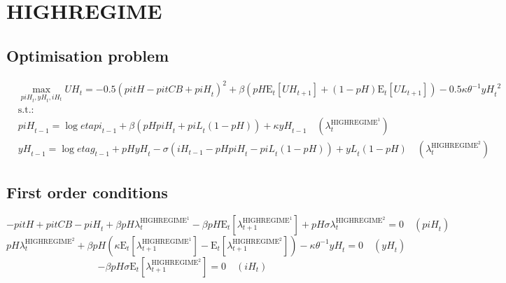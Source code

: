 

\section{HIGHREGIME}

\subsection{Optimisation problem}

\begin{align}
&\max_{{p\!i\!H}_{t}, {y\!H}_{t}, {i\!H}_{t}
} {U\!H}_{t} = -0.5\left({p\!i\!t\!H} - {p\!i\!t\!C\!B} + {p\!i\!H}_{t}\right)^{2} + {\beta} \left({{p\!H}} {\mathrm{E}_{t}\left[{U\!H}_{t+1}\right]} + \left(1 - {p\!H}\right) {\mathrm{E}_{t}\left[{U\!L}_{t+1}\right]}\right) - 0.5{\kappa} {\theta}^{-1} {{y\!H}_{t}}^{2}\\
&\mathrm{s.t.:}\nonumber\\
& {p\!i\!H}_{t-1} = \log{{e\!t\!a\!p\!i}_{t-1}} + {\beta} \left({{p\!H}} {{p\!i\!H}_{t}} + {{p\!i\!L}_{t}} \left(1 - {p\!H}\right)\right) + {\kappa} {{y\!H}_{t-1}} \quad \left(\lambda^{\mathrm{HIGHREGIME}^{\mathrm{1}}}_{t}\right)\\
& {y\!H}_{t-1} = \log{{e\!t\!a\!g}_{t-1}} + {{p\!H}} {{y\!H}_{t}} - {\sigma} \left({i\!H}_{t-1} - {{p\!H}} {{p\!i\!H}_{t}} - {{p\!i\!L}_{t}} \left(1 - {p\!H}\right)\right) + {{y\!L}_{t}} \left(1 - {p\!H}\right) \quad \left(\lambda^{\mathrm{HIGHREGIME}^{\mathrm{2}}}_{t}\right)
\end{align}


\subsection{First order conditions}

\begin{equation}
-{p\!i\!t\!H} + {p\!i\!t\!C\!B} - {p\!i\!H}_{t} + {\beta} {{p\!H}} {\lambda^{\mathrm{HIGHREGIME}^{\mathrm{1}}}_{t}} - {\beta} {{p\!H}} {\mathrm{E}_{t}\left[\lambda^{\mathrm{HIGHREGIME}^{\mathrm{1}}}_{t+1}\right]} + {{p\!H}} {\sigma} {\lambda^{\mathrm{HIGHREGIME}^{\mathrm{2}}}_{t}} = 0
 \quad \left({p\!i\!H}_{t}\right)
\end{equation}
\begin{equation}
{{p\!H}} {\lambda^{\mathrm{HIGHREGIME}^{\mathrm{2}}}_{t}} + {\beta} {{p\!H}} \left({\kappa} {\mathrm{E}_{t}\left[\lambda^{\mathrm{HIGHREGIME}^{\mathrm{1}}}_{t+1}\right]} - \mathrm{E}_{t}\left[\lambda^{\mathrm{HIGHREGIME}^{\mathrm{2}}}_{t+1}\right]\right) - {\kappa} {\theta}^{-1} {{y\!H}_{t}} = 0
 \quad \left({y\!H}_{t}\right)
\end{equation}
\begin{equation}
-{\beta} {{p\!H}} {\sigma} {\mathrm{E}_{t}\left[\lambda^{\mathrm{HIGHREGIME}^{\mathrm{2}}}_{t+1}\right]} = 0
 \quad \left({i\!H}_{t}\right)
\end{equation}




